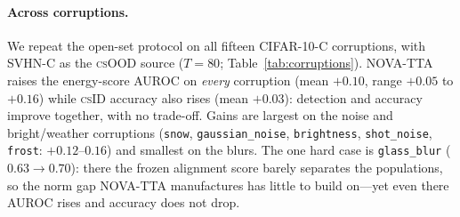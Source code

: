 \documentclass[11pt]{article}
\newcommand{\csid}{\textsc{cs}ID}
\newcommand{\csood}{\textsc{cs}OOD}
\newcommand{\method}[1]{\textsc{#1}}
\begin{document}
\paragraph{Across corruptions.} We repeat the open-set protocol on all fifteen
CIFAR-10-C corruptions, with SVHN-C as the \csood{} source ($T{=}80$;
Table~\ref{tab:corruptions}). \method{NOVA-TTA} raises the energy-score AUROC on
\emph{every} corruption (mean $+0.10$, range $+0.05$ to $+0.16$) while \csid{}
accuracy also rises (mean $+0.03$): detection and accuracy improve together,
with no trade-off. Gains are largest on the noise and bright/weather
corruptions (\texttt{snow}, \texttt{gaussian\_noise}, \texttt{brightness},
\texttt{shot\_noise}, \texttt{frost}: $+0.12$--$0.16$) and smallest on
the blurs. The one hard case is \texttt{glass\_blur} ($0.63\!\to\!0.70$): there
the frozen alignment score barely separates the populations, so the norm gap
\method{NOVA-TTA} manufactures has little to build on---yet even there AUROC
rises and accuracy does not drop.
\end{document}
